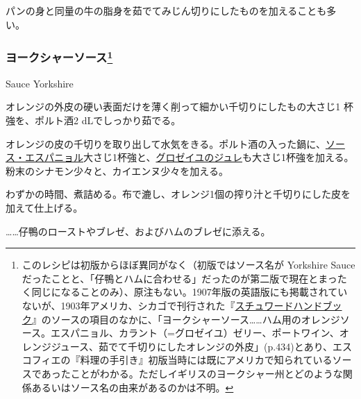 \begin{recette}
パンの身と同量の牛の脂身を茹でてみじん切りにしたものを加えることも多い。

\atoaki{}

\hypertarget{sauce-yorkshire}{%
\subsubsection[ヨークシャーソース]{\texorpdfstring{ヨークシャーソース\footnote{このレシピは初版からほぼ異同がなく（初版ではソース名が
  Yorkshire
  Sauceだったことと、「仔鴨とハムに合わせる」だったのが第二版で現在とまったく同じになることのみ）、原注もない。1907年版の英語版にも掲載されていないが、1903年アメリカ、シカゴで刊行された『\href{https://archive.org/details/stewardshandbook00whitiala}{スチュワードハンドブック}』のソースの項目のなかに、「ヨークシャーソース\ldots{}\ldots{}ハム用のオレンジソース。エスパニョル、カラント（=グロゼイユ）ゼリー、ポートワイン、オレンジジュース、茹でて千切りにしたオレンジの外皮」(p.434)とあり、エスコフィエの『料理の手引き』初版当時には既にアメリカで知られているソースであったことがわかる。ただしイギリスのヨークシャー州とどのような関係あるいはソース名の由来があるのかは不明。}}{ヨークシャーソース}}\label{sauce-yorkshire}}

\begin{frsubenv}

Sauce Yorkshire

\end{frsubenv}


オレンジの外皮の硬い表面だけを薄く削って細かい千切りにしたもの大さじ1
杯強を、ポルト酒2 dLでしっかり茹でる。

オレンジの皮の千切りを取り出して水気をきる。ポルト酒の入った鍋に、\protect\hyperlink{sauce-espagnole}{ソース・エスパニョル}大さじ1杯強と、\protect\hyperlink{}{グロゼイユのジュレ}も大さじ1杯強を加える。粉末のシナモン少々と、カイエンヌ少々を加える。

わずかの時間、煮詰める。布で漉し、オレンジ1個の搾り汁と千切りにした皮を加えて仕上げる。

\ldots{}\ldots{}仔鴨のローストやブレゼ、およびハムのブレゼに添える。

\end{recette}
